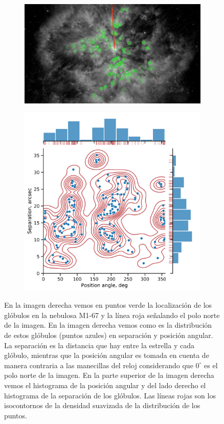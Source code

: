 \documentclass{book}
\begin{document}
\begin{figure}[htb]
    \centering  
    \begin{subfigure}[b]{0.45\linewidth}
        \includegraphics[width=\textwidth]{Nuevas imagenes finales/m1_67_glo_.png}
    \end{subfigure}
    \begin{subfigure}[b]{0.45\linewidth}
        \includegraphics[width=\textwidth]{images Chapter 2/C2_nudos_distribucion.png}
    \end{subfigure}
    \caption{En la imagen derecha vemos en puntos verde la localización de los glóbulos en la nebulosa M1-67 y la línea roja señalando el polo norte de la imagen. En la imagen derecha vemos como es la distribución de estos glóbulos (puntos azules) en separación y posición angular. La separación es la distancia que hay entre la estrella y cada glóbulo, mientras que la posición angular es tomada en cuenta de manera contraria a las manecillas del reloj considerando que $0^\circ$ es el polo norte de la imagen. En la parte superior de la imagen derecha vemos el histograma de la posición angular y del lado derecho el histograma de la separación de los glóbulos. Las  líneas rojas son los isocontornos de la densidad suavizada de la distribución de los puntos.} 
    \label{fig:dis_nudos}
\end{figure}
\end{document}
